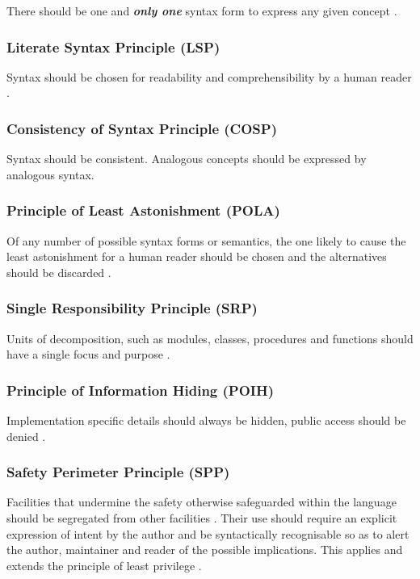 \documentclass[10pt,a4paper]{article}
\renewcommand{\emph}[1]{\textbf{\textit{#1}}}
\begin{document}
There should be one and \emph{only one} syntax form to express any given
concept \cite{Dijkstra78}.

\subsubsection{Literate Syntax Principle (LSP)}
\label{LSP}

Syntax should be chosen for readability and comprehensibility by a human
reader \cite{Knuth84}.

\subsubsection{Consistency of Syntax Principle (COSP)}
\label{COSP}

Syntax should be consistent. Analogous concepts should be expressed by
analogous syntax.

\subsubsection{Principle of Least Astonishment (POLA)}
\label{POLA}

Of any number of possible syntax forms or semantics, the one likely to cause
the least astonishment for a human reader should be chosen and the alternatives
should be discarded \cite{Geoffrey87}.

\subsubsection{Single Responsibility Principle (SRP)}
\label{SRP}

Units of decomposition, such as modules, classes, procedures and functions
should have a single focus and purpose \cite{Martin09}.

\subsubsection{Principle of Information Hiding (POIH)}
\label{POIH}

Implementation specific details should always be hidden, public access should
be denied \cite{Parnas72}.

\subsubsection{Safety Perimeter Principle (SPP)}
\label{SPP}

Facilities that undermine the safety otherwise safeguarded within the language
should be segregated from other facilities \cite[ch.29]{Wirth88}. Their
use should require an explicit expression of intent by the author and be
syntactically recognisable so as to alert the author, maintainer and reader
of the possible implications. This applies and extends the principle of least
privilege \cite{Saltzer74}.
\end{document}
